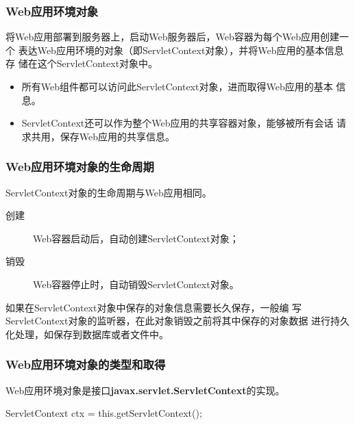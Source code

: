 \begin{frame}[fragile] %
  \frametitle{Web应用环境对象} 

  将Web应用部署到服务器上，启动Web服务器后，Web容器为每个Web应用创建一个
  表达Web应用环境的对象（即ServletContext对象），并将Web应用的基本信息存
  储在这个ServletContext对象中。


  \begin{itemize}\kai
  \item 所有Web组件都可以访问此ServletContext对象，进而取得Web应用的基本
    信息。
  \item ServletContext还可以作为整个Web应用的共享容器对象，能够被所有会话
    请求共用，保存Web应用的共享信息。
  \end{itemize}
\end{frame}

\begin{frame}[fragile] %
  \frametitle{Web应用环境对象的生命周期} 

  ServletContext对象的生命周期与Web应用相同。

  \begin{description}
  \item[创建] Web容器启动后，自动创建ServletContext对象；
  \item[销毁] Web容器停止时，自动销毁ServletContext对象。
  \end{description}

  \pause
  

  {\kai 如果在ServletContext对象中保存的对象信息需要长久保存，一般编
    写ServletContext对象的监听器，在此对象销毁之前将其中保存的对象数据
    进行持久化处理，如保存到数据库或者文件中。}
\end{frame}

\begin{frame}[fragile] %
  \frametitle{Web应用环境对象的类型和取得} 

  Web应用环境对象是接口{\bf\Blue javax.servlet.ServletContext}的实现。


  \begin{javaCode}
    ServletContext ctx = this.getServletContext();
  \end{javaCode}
\end{frame}


